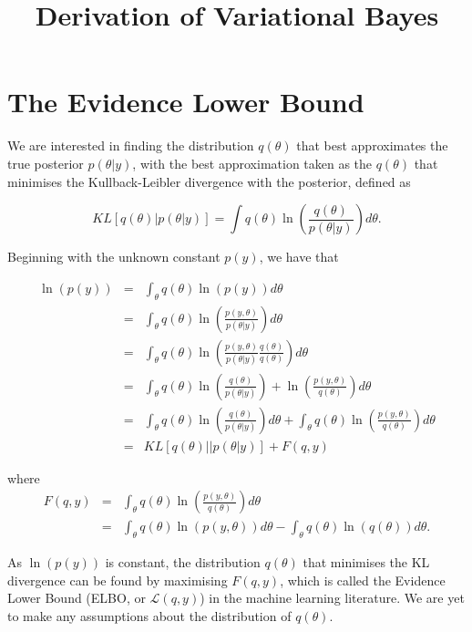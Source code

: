 \documentclass[12pt]{article}\usepackage[]{graphicx}\usepackage[]{color}
\begin{document}
\title{Derivation of Variational Bayes}

\section{The Evidence Lower Bound}

We are interested in finding the distribution $q(\theta)$ that best approximates the true posterior $p(\theta|y)$, with the best approximation taken as the $q(\theta)$ that minimises the Kullback-Leibler divergence with the posterior, defined as

$$KL[q(\theta)|p(\theta|y)] = \int q(\theta) \ln \left( \frac{q(\theta)}{p(\theta|y)}\right) d\theta.$$

Beginning with the unknown constant $p(y)$, we have that

\begin{eqnarray}
\ln(p(y)) & = & \int_{\theta} q(\theta) \ln(p(y)) d\theta \nonumber \\
& = & \int_{\theta} q(\theta) \ln  \left( \frac{p(y, \theta)}{p(\theta | y)} \right) d\theta \nonumber \\
& = & \int_{\theta} q(\theta) \ln  \left( \frac{p(y, \theta)}{p(\theta | y)} \frac{q(\theta)}{q(\theta)}\right) d\theta \nonumber \\
& = & \int_{\theta} q(\theta) \ln  \left( \frac{q(\theta)}{p(\theta | y)}\right) + \ln \left( \frac{p(y, \theta)}{q(\theta)} \right) d\theta \nonumber \\
& = & \int_{\theta} q(\theta) \ln  \left( \frac{q(\theta)}{p(\theta | y)}\right) d\theta + \int_{\theta} q(\theta) \ln \left( \frac{p(y, \theta)}{q(\theta)} \right) d\theta \nonumber \\
& = & KL [q(\theta) || p(\theta | y)] + F(q, y) \nonumber
\end{eqnarray}

where 
\begin{eqnarray*}
F(q, y) & = & \int_{\theta} q(\theta) \ln \left( \frac{p(y, \theta)}{q(\theta)} \right) d\theta \\
& = &  \int_{\theta} q(\theta) \ln (p(y, \theta)) d\theta -  \int_{\theta} q(\theta) \ln (q(\theta)) d\theta.
\end{eqnarray*}

As $\ln(p(y))$ is constant, the distribution $q(\theta)$ that minimises the KL divergence can be found by maximising $F(q, y)$, which is called the Evidence Lower Bound (ELBO, or $\mathcal{L}(q, y)$) in the machine learning literature. We are yet to make any assumptions about the distribution of $q(\theta)$.
\end{document}
